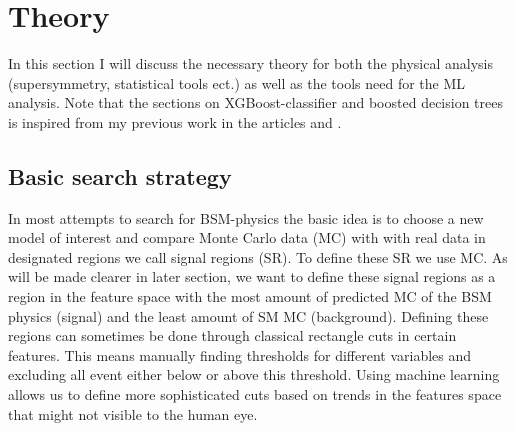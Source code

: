 \documentclass{article}
\begin{document}
\section{Theory}
In this section I will discuss the necessary theory for both the physical analysis (supersymmetry, statistical tools ect.) as well as the tools need for the ML analysis. Note that the sections on XGBoost-classifier and boosted decision trees  is inspired from my previous work in the articles \cite{FYSSTK} and \cite{HIGGS}.
\subsection{Basic search strategy}
In most attempts to search for BSM-physics the basic idea is to choose a new model of interest and compare Monte Carlo data (MC) with with real data in designated regions we call signal regions (SR). To define these SR we use MC. As will be made clearer in later section, we want to define these signal regions as a region in the feature space with the most amount of predicted MC of the BSM physics (signal) and the least amount of SM MC (background). Defining these regions can sometimes be done through classical rectangle cuts in certain features. This means manually finding thresholds for different variables and excluding all event either below or above this threshold. Using machine learning allows us to define more sophisticated cuts based on trends in the features space that might not visible to the human eye. 
\end{document}
